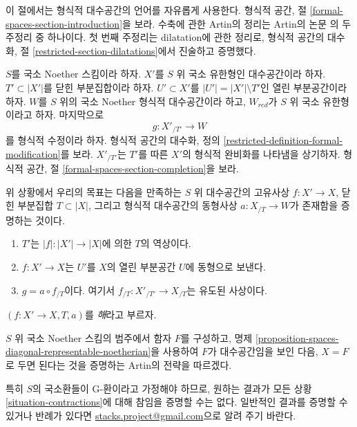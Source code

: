 \noindent
이 절에서는 형식적 대수공간의 언어를 자유롭게 사용한다.
형식적 공간, 절 \ref{formal-spaces-section-introduction}을 보라.
수축에 관한 Artin의 정리는 Artin의 논문 \cite{ArtinII}의 두 주정리 중
하나이다. 첫 번째 주정리는 dilatation에 관한 정리로, 형식적 공간의
대수화, 절 \ref{restricted-section-dilatations}에서 진술하고 증명했다.

\begin{situation}
\label{situation-contractions}
$S$를 국소 Noether 스킴이라 하자. $X'$를 $S$ 위 국소 유한형인
대수공간이라 하자. $T' \subset |X'|$를 닫힌 부분집합이라 하자.
$U' \subset X'$를 $|U'| = |X'| \setminus T'$인 열린 부분공간이라 하자.
$W$를 $S$ 위의 국소 Noether 형식적 대수공간이라 하고,
$W_{red}$가 $S$ 위 국소 유한형이라고 하자. 마지막으로
$$
g : X'_{/T'} \longrightarrow W
$$
를 형식적 수정이라 하자. 형식적 공간의 대수화, 정의
\ref{restricted-definition-formal-modification}를 보라.
$X'_{/T'}$는 $T'$를 따른 $X'$의 형식적 완비화를 나타냄을 상기하자.
형식적 공간, 절 \ref{formal-spaces-section-completion}을 보라.
\end{situation}

\noindent
위 상황에서 우리의 목표는 다음을 만족하는 $S$ 위 대수공간의 고유사상
$f : X' \to X$, 닫힌 부분집합 $T \subset |X|$, 그리고 형식적 대수공간의
동형사상 $a : X_{/T} \to W$가 존재함을 증명하는 것이다.
\begin{enumerate}
\item $T'$는 $|f| : |X'| \to |X|$에 의한 $T$의 역상이다.
\item $f : X' \to X$는 $U'$를 $X$의 열린 부분공간 $U$에 동형으로 보낸다.
\item $g = a \circ f_{/T}$이다. 여기서
$f_{/T} : X'_{/T'} \to X_{/T}$는 유도된 사상이다.
\end{enumerate}
$(f : X' \to X, T, a)$를 {\it 해}라고 부르자.

\medskip\noindent
$S$ 위 국소 Noether 스킴의 범주에서 함자 $F$를 구성하고,
명제 \ref{proposition-spaces-diagonal-representable-noetherian}을 사용하여
$F$가 대수공간임을 보인 다음, $X = F$로 두면 된다는 것을 증명하는
Artin의 전략을 따르겠다.

\begin{remark}
\label{remark-G-rings}
특히 $S$의 국소환들이 G-환이라고 가정해야 하므로, 원하는 결과가
모든 상황 \ref{situation-contractions}에 대해 참임을 증명할 수는 없다.
일반적인 결과를 증명할 수 있거나 반례가 있다면
\href{mailto:stacks.project@gmail.com}{stacks.project@gmail.com}으로
알려 주기 바란다.
\end{remark}

